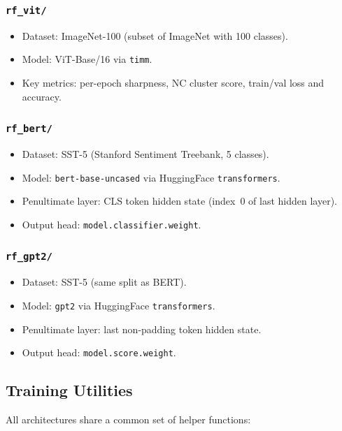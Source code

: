 \documentclass[11pt,a4paper]{article}
\theoremstyle{definition}
\begin{document}
\subsubsection*{\texttt{rf\_vit/}}
\begin{itemize}[leftmargin=*]
    \item Dataset: ImageNet-100 (subset of ImageNet with 100 classes).
    \item Model: ViT-Base/16 via \texttt{timm}.
    \item Key metrics: per-epoch sharpness, NC cluster score, train/val loss and accuracy.
\end{itemize}

\subsubsection*{\texttt{rf\_bert/}}
\begin{itemize}[leftmargin=*]
    \item Dataset: SST-5 (Stanford Sentiment Treebank, 5 classes).
    \item Model: \texttt{bert-base-uncased} via HuggingFace \texttt{transformers}.
    \item Penultimate layer: CLS token hidden state (index~0 of last hidden layer).
    \item Output head: \texttt{model.classifier.weight}.
\end{itemize}

\subsubsection*{\texttt{rf\_gpt2/}}
\begin{itemize}[leftmargin=*]
    \item Dataset: SST-5 (same split as BERT).
    \item Model: \texttt{gpt2} via HuggingFace \texttt{transformers}.
    \item Penultimate layer: last non-padding token hidden state.
    \item Output head: \texttt{model.score.weight}.
\end{itemize}

\subsection{Training Utilities}

All architectures share a common set of helper functions:
\end{document}
